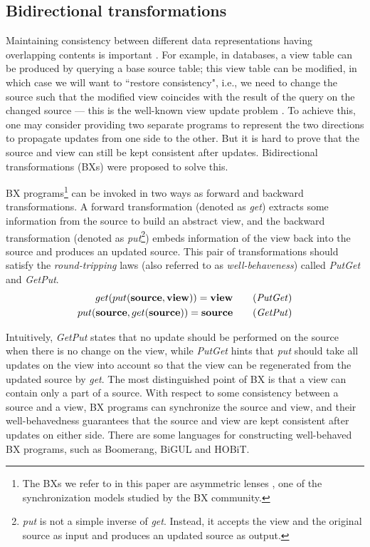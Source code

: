 \documentclass[conference]{IEEEtran}
\begin{document}
	\subsection{Bidirectional transformations}
	Maintaining consistency between different data representations having overlapping  contents is important \cite{abou2018introduction}. For example, in databases, a view table can be produced by querying a base source table; this view table can be modified, in which case we will want to ``restore consistency", i.e.,  we need to change the source such that the modified view coincides with the result of the query on the changed source --- this is the well-known view update problem \cite{bancilhon1981update}. To achieve this, one may consider providing two separate programs to represent the two directions to propagate updates from one side to the other. But it is hard to prove that the source and view can still be kept consistent after updates. Bidirectional transformations (BXs) were proposed  \cite{czarnecki2009bidirectional} to solve this.
	
	BX programs\footnote{The BXs we refer to in this paper are asymmetric lenses \cite{foster2007combinators}, one of the synchronization models studied by the BX community. } can be invoked in two ways as forward and backward transformations. A forward transformation (denoted as \emph{get}) extracts some information from the source to build an abstract view, and the backward transformation (denoted as \emph{put}\footnote{\emph{put} is not a simple inverse of \emph{get}. Instead, it accepts the view and the original source as input and produces an updated source as output.}) embeds information of the view back into the source and produces an updated source. This pair of transformations should satisfy the {\em round-tripping} laws (also referred to as {\em well-behaveness}) called \emph{PutGet} and \emph{GetPut}. 
	\begin{align}
	get (put(\textbf{source}, \textbf{view}))= \textbf{view} \tag {\emph{PutGet}} \\
	put (\textbf{source}, get (\textbf{source})) = \textbf{source} \tag {\emph{GetPut}} 
	\end{align}
	
	Intuitively, \emph{GetPut} states that no update should be performed on the source when there is no change on the view, while \emph{PutGet} hints that \emph{put} should take all updates on the view into account so that the view can be regenerated from the updated source by \emph{get}. 
	The most distinguished point of BX is that a view can contain only a part of a source. With respect to some consistency between a source and a view, BX programs can synchronize the source and view, and their well-behavedness guarantees that the source and view are kept consistent after updates on either side. There are some languages for constructing well-behaved BX programs, such as Boomerang\cite{bohannon2008boomerang}, BiGUL \cite{bigul} and HOBiT\cite{matsuda2018hobit}.
	
\end{document}
